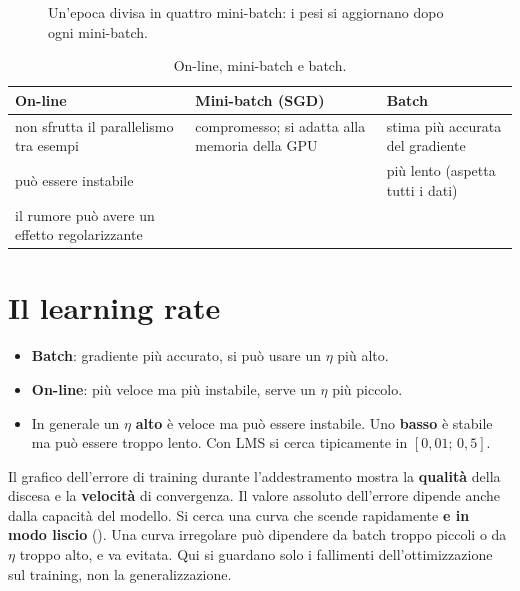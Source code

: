 \begin{figure}[ht]
\centering
{}
\caption{Un'epoca divisa in quattro mini-batch: i pesi si aggiornano dopo ogni mini-batch.}
\label{fig:minibatch}
\end{figure}

\begin{table}[ht]
\centering\small
\caption{On-line, mini-batch e batch.}
\begin{tabularx}{0.95\linewidth}{XXX}
\toprule
On-line & Mini-batch (SGD) & Batch \\
\midrule
non sfrutta il parallelismo tra esempi & compromesso; si adatta alla memoria della GPU & stima più accurata del gradiente \\
può essere instabile & & più lento (aspetta tutti i dati) \\
il rumore può avere un effetto regolarizzante & & \\
\bottomrule
\end{tabularx}
\end{table}

\section{Il learning rate}
\label{sec:learning-rate}

\begin{itemize}
  \item \textbf{Batch}: gradiente più accurato, si può usare un $\eta$ più alto.
  \item \textbf{On-line}: più veloce ma più instabile, serve un $\eta$ più piccolo.
  \item In generale un $\eta$ \textbf{alto} è veloce ma può essere instabile. Uno \textbf{basso} è stabile ma può
        essere troppo lento. Con LMS si cerca tipicamente in $[0{,}01;\,0{,}5]$.
\end{itemize}

\begin{idea}
Il grafico dell'errore di training durante l'addestramento mostra la \textbf{qualità} della discesa e la
\textbf{velocità} di convergenza. Il valore assoluto dell'errore dipende anche dalla capacità del modello. Si cerca
una curva che scende rapidamente \textbf{e in modo liscio} (). Una curva irregolare può
dipendere da batch troppo piccoli o da $\eta$ troppo alto, e va evitata. Qui si guardano solo i fallimenti
dell'ottimizzazione sul training, non la generalizzazione.
\end{idea}

